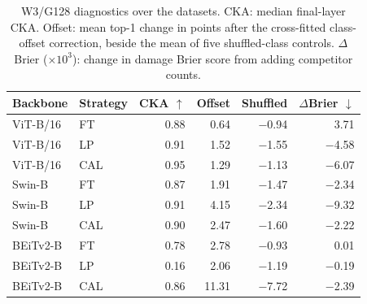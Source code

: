 \begin{table}[h]
\centering
\caption{W3/G128 diagnostics over the {} datasets. CKA: median final-layer CKA. Offset: mean top-1 change in points after the cross-fitted class-offset correction, beside the mean of five shuffled-class controls. $\Delta$Brier ($\times 10^{3}$): change in damage Brier score from adding competitor counts.}
\label{tab:diagnostics}
\setlength{\tabcolsep}{3pt}
\small
\begin{tabular}{llrrrr}
\toprule
Backbone & Strategy & CKA $\uparrow$ & Offset & Shuffled & $\Delta$Brier $\downarrow$ \\
\midrule
ViT-B/16 & FT & 0.88 & 0.64 & $-$0.94 & 3.71 \\
ViT-B/16 & LP & 0.91 & 1.52 & $-$1.55 & $-$4.58 \\
ViT-B/16 & CAL & 0.95 & 1.29 & $-$1.13 & $-$6.07 \\
Swin-B & FT & 0.87 & 1.91 & $-$1.47 & $-$2.34 \\
Swin-B & LP & 0.91 & 4.15 & $-$2.34 & $-$9.32 \\
Swin-B & CAL & 0.90 & 2.47 & $-$1.60 & $-$2.22 \\
BEiTv2-B & FT & 0.78 & 2.78 & $-$0.93 & 0.01 \\
BEiTv2-B & LP & 0.16 & 2.06 & $-$1.19 & $-$0.19 \\
BEiTv2-B & CAL & 0.86 & 11.31 & $-$7.72 & $-$2.39 \\
\bottomrule
\end{tabular}
\end{table}
